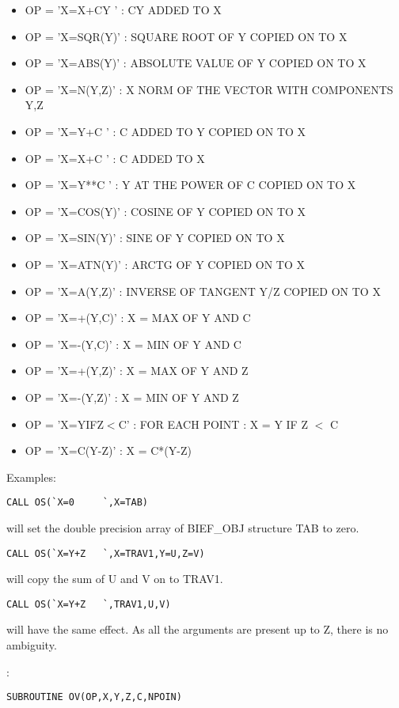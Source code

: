 \begin{itemize}
  \item OP = 'X=X+CY  ' :  CY ADDED TO X
  \item OP = 'X=SQR(Y)' :  SQUARE ROOT OF Y COPIED ON TO X
  \item OP = 'X=ABS(Y)' :  ABSOLUTE VALUE OF Y COPIED ON TO X
  \item OP = 'X=N(Y,Z)' :  X NORM OF THE VECTOR WITH COMPONENTS Y,Z
  \item OP = 'X=Y+C   ' :  C ADDED TO Y COPIED ON TO X
  \item OP = 'X=X+C   ' :  C ADDED TO X
  \item OP = 'X=Y**C  ' :  Y AT THE POWER OF C COPIED ON TO X
  \item OP = 'X=COS(Y)' :  COSINE OF Y COPIED ON TO X
  \item OP = 'X=SIN(Y)' :  SINE OF Y COPIED ON TO X
  \item OP = 'X=ATN(Y)' :  ARCTG OF Y COPIED ON TO X
  \item OP = 'X=A(Y,Z)' :  INVERSE OF TANGENT Y/Z COPIED ON TO X
  \item OP = 'X=+(Y,C)' :  X = MAX OF Y AND C
  \item OP = 'X=-(Y,C)' :  X = MIN OF Y AND C
  \item OP = 'X=+(Y,Z)' :  X = MAX OF Y AND Z
  \item OP = 'X=-(Y,Z)' :  X = MIN OF Y AND Z
  \item OP = 'X=YIFZ$<$C' :  FOR EACH POINT : X = Y IF Z $<$ C
  \item OP = 'X=C(Y-Z)' :  X = C*(Y-Z)
\end{itemize}

Examples:

\begin{lstlisting}[language=TelFortran]
CALL OS(`X=0     `,X=TAB)
\end{lstlisting}
will set the double precision array of BIEF\_OBJ structure TAB to zero.

\begin{lstlisting}[language=TelFortran]
CALL OS(`X=Y+Z   `,X=TRAV1,Y=U,Z=V)
\end{lstlisting}
will copy the sum of U and V on to TRAV1.

\begin{lstlisting}[language=TelFortran]
CALL OS(`X=Y+Z   `,TRAV1,U,V)
\end{lstlisting}
will have the same effect. As all the arguments are present up to Z, there is
no ambiguity.

:
\begin{lstlisting}[language=TelFortran]
SUBROUTINE OV(OP,X,Y,Z,C,NPOIN)
\end{lstlisting}

